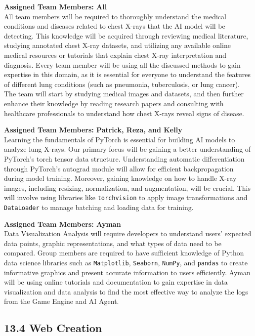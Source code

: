\documentclass[12pt]{article}
\begin{document}
\begin{enumerate}
\textbf{Assigned Team Members: All} \\
All team members will be required to thoroughly understand the medical conditions and diseases related to chest X-rays that the AI model will be detecting. This knowledge will be acquired through reviewing medical literature, studying annotated chest X-ray datasets, and utilizing any available online medical resources or tutorials that explain chest X-ray interpretation and diagnosis. Every team member will be using all the discussed methods to gain expertise in this domain, as it is essential for everyone to understand the features of different lung conditions (such as pneumonia, tuberculosis, or lung cancer). The team will start by studying medical images and datasets, and then further enhance their knowledge by reading research papers and consulting with healthcare professionals to understand how chest X-rays reveal signs of disease.


\textbf{Assigned Team Members: Patrick, Reza, and Kelly} \\
Learning the fundamentals of PyTorch is essential for building AI models to analyze lung X-rays. Our primary focus will be gaining a better understanding of PyTorch's torch tensor data structure. Understanding automatic differentiation through PyTorch's autograd module will allow for efficient backpropagation during model training. Moreover, gaining knowledge on how to handle X-ray images, including resizing, normalization, and augmentation, will be crucial. This will involve using libraries like \texttt{torchvision} to apply image transformations and \texttt{DataLoader} to manage batching and loading data for training.


\textbf{Assigned Team Members: Ayman} \\
Data Visualization Analysis will require developers to understand users' expected data points, graphic representations, and what types of data need to be compared. Group members are required to have sufficient knowledge of Python data science libraries such as \texttt{Matplotlib}, \texttt{Seaborn}, \texttt{NumPy}, and \texttt{pandas} to create informative graphics and present accurate information to users efficiently. Ayman will be using online tutorials and documentation to gain expertise in data visualization and data analysis to find the most effective way to analyze the logs from the Game Engine and AI Agent.

\subsection*{13.4 Web Creation}


\end{enumerate}
\end{document}
